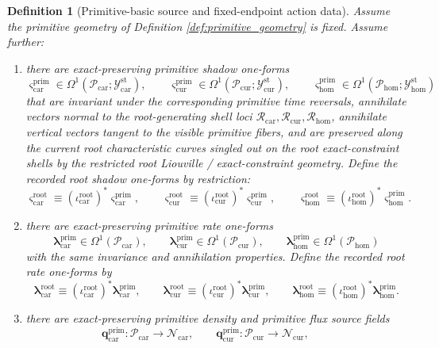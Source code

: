 \documentclass[11pt]{article}
\newcommand{\TensorStatTagClass}{\mathcal Y_{\mathrm{car}}^{\mathrm{st}}}
\newcommand{\CurStatTagClass}{\mathcal Y_{\mathrm{cur}}^{\mathrm{st}}}
\newcommand{\HomStatTagClass}{\mathcal Y_{\mathrm{hom}}^{\mathrm{st}}}
\newcommand{\TensorDensityClass}{\mathscr N_{\mathrm{car}}}
\newcommand{\CurDensityClass}{\mathscr N_{\mathrm{cur}}}
\newcommand{\TensorRootSpace}{\mathcal R_{\mathrm{car}}}
\newcommand{\CurRootSpace}{\mathcal R_{\mathrm{cur}}}
\newcommand{\HomRootSpace}{\mathcal R_{\mathrm{hom}}}
\newcommand{\TensorRootShadowForm}{\boldsymbol{\varsigma}_{\mathrm{car}}^{\mathrm{root}}}
\newcommand{\CurRootShadowForm}{\boldsymbol{\varsigma}_{\mathrm{cur}}^{\mathrm{root}}}
\newcommand{\HomRootShadowForm}{\boldsymbol{\varsigma}_{\mathrm{hom}}^{\mathrm{root}}}
\newcommand{\TensorRootRateForm}{\boldsymbol{\lambda}_{\mathrm{car}}^{\mathrm{root}}}
\newcommand{\CurRootRateForm}{\boldsymbol{\lambda}_{\mathrm{cur}}^{\mathrm{root}}}
\newcommand{\HomRootRateForm}{\boldsymbol{\lambda}_{\mathrm{hom}}^{\mathrm{root}}}
\newcommand{\TensorPrimitiveSpace}{\mathcal P_{\mathrm{car}}}
\newcommand{\CurPrimitiveSpace}{\mathcal P_{\mathrm{cur}}}
\newcommand{\HomPrimitiveSpace}{\mathcal P_{\mathrm{hom}}}
\newcommand{\TensorRootInc}{\iota_{\mathrm{car}}^{\mathrm{root}}}
\newcommand{\CurRootInc}{\iota_{\mathrm{cur}}^{\mathrm{root}}}
\newcommand{\HomRootInc}{\iota_{\mathrm{hom}}^{\mathrm{root}}}
\newcommand{\TensorPrimitiveShadowForm}{\boldsymbol{\varsigma}_{\mathrm{car}}^{\mathrm{prim}}}
\newcommand{\CurPrimitiveShadowForm}{\boldsymbol{\varsigma}_{\mathrm{cur}}^{\mathrm{prim}}}
\newcommand{\HomPrimitiveShadowForm}{\boldsymbol{\varsigma}_{\mathrm{hom}}^{\mathrm{prim}}}
\newcommand{\TensorPrimitiveRateForm}{\boldsymbol{\lambda}_{\mathrm{car}}^{\mathrm{prim}}}
\newcommand{\CurPrimitiveRateForm}{\boldsymbol{\lambda}_{\mathrm{cur}}^{\mathrm{prim}}}
\newcommand{\HomPrimitiveRateForm}{\boldsymbol{\lambda}_{\mathrm{hom}}^{\mathrm{prim}}}
\newcommand{\TensorPrimitiveDensitySource}{\boldsymbol{q}_{\mathrm{car}}^{\mathrm{prim}}}
\newcommand{\CurPrimitiveDensitySource}{\boldsymbol{q}_{\mathrm{cur}}^{\mathrm{prim}}}
\newtheorem{definition}{Definition}
\begin{document}
\begin{definition}[Primitive-basic source and fixed-endpoint action data]
\label{def:primitive_basic}
Assume the primitive geometry of Definition \ref{def:primitive_geometry} is fixed. Assume further:
\begin{enumerate}
    \item there are exact-preserving primitive shadow one-forms
    \[
    \TensorPrimitiveShadowForm\in\Omega^1(\TensorPrimitiveSpace;\TensorStatTagClass),\qquad
    \CurPrimitiveShadowForm\in\Omega^1(\CurPrimitiveSpace;\CurStatTagClass),\qquad
    \HomPrimitiveShadowForm\in\Omega^1(\HomPrimitiveSpace;\HomStatTagClass)
    \]
    that are invariant under the corresponding primitive time reversals, annihilate vectors normal to the root-generating shell loci \(\TensorRootSpace,\CurRootSpace,\HomRootSpace\), annihilate vertical vectors tangent to the visible primitive fibers, and are preserved along the current root characteristic curves singled out on the root exact-constraint shells by the restricted root Liouville / exact-constraint geometry. Define the recorded root shadow one-forms by restriction:
    \begin{equation}
    \TensorRootShadowForm\equiv(\TensorRootInc)^*\TensorPrimitiveShadowForm,\qquad
    \CurRootShadowForm\equiv(\CurRootInc)^*\CurPrimitiveShadowForm,\qquad
    \HomRootShadowForm\equiv(\HomRootInc)^*\HomPrimitiveShadowForm.
    \label{eq:root_shadow_from_primitive}
    \end{equation}
    \item there are exact-preserving primitive rate one-forms
    \[
    \TensorPrimitiveRateForm\in\Omega^1(\TensorPrimitiveSpace),\qquad
    \CurPrimitiveRateForm\in\Omega^1(\CurPrimitiveSpace),\qquad
    \HomPrimitiveRateForm\in\Omega^1(\HomPrimitiveSpace)
    \]
    with the same invariance and annihilation properties. Define the recorded root rate one-forms by
    \begin{equation}
    \TensorRootRateForm\equiv(\TensorRootInc)^*\TensorPrimitiveRateForm,\qquad
    \CurRootRateForm\equiv(\CurRootInc)^*\CurPrimitiveRateForm,\qquad
    \HomRootRateForm\equiv(\HomRootInc)^*\HomPrimitiveRateForm.
    \label{eq:root_rate_from_primitive}
    \end{equation}
    \item there are exact-preserving primitive density and primitive flux source fields
    \[
    \TensorPrimitiveDensitySource:\TensorPrimitiveSpace\to\TensorDensityClass,\qquad
    \CurPrimitiveDensitySource:\CurPrimitiveSpace\to\CurDensityClass,\qquad
\]
\end{enumerate}
\end{definition}
\end{document}
